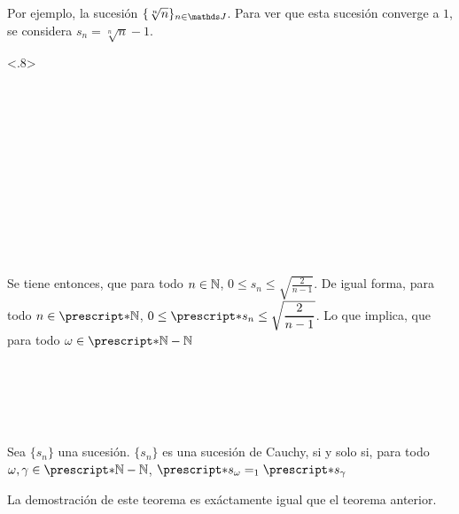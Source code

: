 Por ejemplo, la sucesión $\{\sqrt[n]{n}\}_{n\in\J}$. Para ver que esta sucesión
converge a $1$, se considera $s_n = \sqrt[n]{n} - 1$.
\begin{longderivation}<.8>
    \\
  \equiv\\
    \\
  \equiv\\
    \\
  \To\\
    \\
  \equiv\\
    \\
  \equiv\\
    \\
  \equiv\\
\end{longderivation}

Se tiene entonces, que para todo $n\in\mathbb{N}$, $0\leq s_n \leq \sqrt{\frac{2}{n-1}}$.
De igual forma, para todo $n\in\st{\N}$, $0\leq \st{s_n} \leq \sqrt{\frac{2}{n-1}}$.
Lo que implica, que para todo $\omega\in\st{\N}-\N$
\begin{longderivation}
    \\
  \\
    \\
  \equiv\\
\end{longderivation}

\begin{theorem}
  Sea $\{s_n\}$ una sucesión. $\{s_n\}$ es una sucesión de Cauchy, si y
  solo si, para todo $\omega,\gamma\in\st{\N}-\N$, $\st{s_\omega =_1 \st{s_\gamma}}$
\end{theorem}

La demostración de este teorema es exáctamente igual que el teorema
anterior.